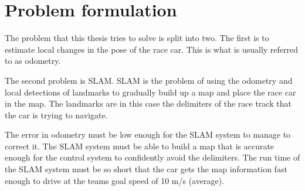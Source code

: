 \section{Problem formulation}

The problem that this thesis tries to solve is split into two. The first is to estimate local changes in the pose of the race car. This is what is usually referred to as odometry. 

The second problem is \gls{SLAM}. \gls{SLAM} is the problem of using the odometry and local detections of landmarks to gradually build up a map and place the race car in the map. The landmarks are in this case the delimiters of the race track that the car is trying to navigate.

The error in odometry must be low enough for the SLAM system to manage to correct it. The SLAM system must be able to build a map that is accurate enough for the control system to confidently avoid the delimiters. The run time of the SLAM system must be so short that the car gets the map information fast enough to drive at the teams goal speed of 10 \si{\metre / \second} (average).